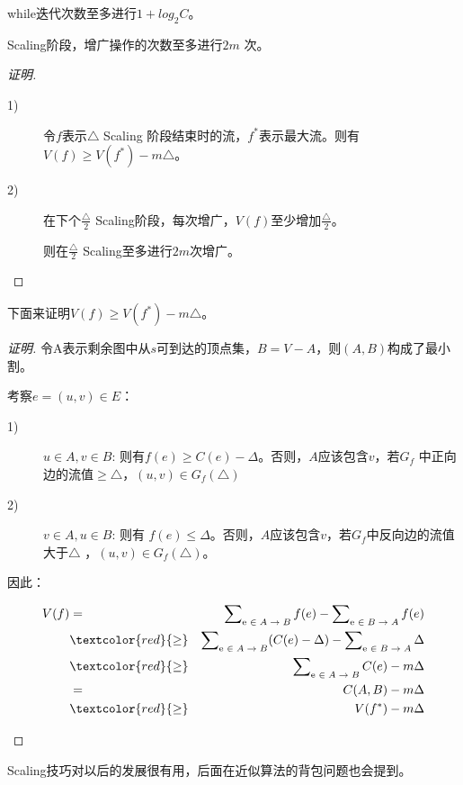 \begin{theorem}[外循环次数]
  while迭代次数至多进行$1+log_2 C$。
\end{theorem}
\begin{theorem}[内循环次数]
  Scaling阶段，增广操作的次数至多进行$2m$ 次。
\end{theorem}
\begin{proof}[证明]

  \begin{description}
\item[1)]令$f$表示$\triangle$ Scaling 阶段结束时的流，$f^*$表示最大流。则有$V(f)\geq V(f^*)-m\triangle$。

\item[2)]在下个$\frac{\triangle}{2}$ Scaling阶段，每次增广，$V(f)$至少增加$\frac{\triangle}{2}$。

则在$\frac{\triangle}{2}$ Scaling至多进行$2m$次增广。
\end{description}
\end{proof}
下面来证明$V(f)\geq V(f^*)-m\triangle$。
\begin{proof}[证明]
  令A表示剩余图中从$s$可到达的顶点集，$B=V-A$，则$(A,B)$构成了最小割。

  考察$e=(u,v)\in E$：

  \begin{description}
    \item[1)]$u \in A, v \in B$: 则有$f(e) \geq C(e) - \Delta $。否则，$A$应该包含$v$，若$G_f$ 中正向边的流值$\geq \triangle$，$(u,v)\in G_f(\triangle)$

 \item[2)] $v \in A, u \in B$: 则有 $f(e) \leq \Delta$。否则，$A$应该包含$v$，若$G_f$中反向边的流值大于$\triangle$ ，$(u,v)\in G_f(\triangle)$。
  \end{description}
  因此：

  \begin{scriptsize}
\begin{eqnarray}
  V(f)   &=& \sum\nolimits_{\text{e $\in A\rightarrow B$}} f(e) - \sum\nolimits_{\text{e $\in B\rightarrow A$}} f(e) \nonumber \\
     &\textcolor{red}{\geq}& \sum\nolimits_{\text{e $\in A\rightarrow B$}} ( C(e) - \Delta) - \sum\nolimits_{\text{e $\in B\rightarrow A$}} \Delta \nonumber \\
     &\textcolor{red}{\geq}& \sum\nolimits_{\text{e $\in A\rightarrow B$}} C(e) - m \Delta \nonumber \\
     &=& C(A, B) - m \Delta \nonumber \\
     &\textcolor{red}{\geq}& V(f^*) - m \Delta \nonumber
\end{eqnarray}
\end{scriptsize}
\end{proof}
Scaling技巧对以后的发展很有用，后面在近似算法的背包问题也会提到。
